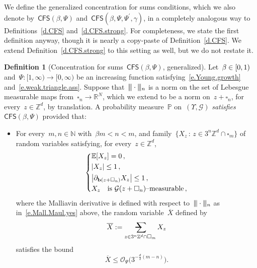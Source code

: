 \documentclass[11pt,twoside]{article} %
\makeatletter
\let\oldsquare\square %
\renewcommand{\square}{\oldsquare}
\numberwithin{equation}{section}
\theoremstyle{definition}
\newtheorem{definition}[theorem]{Definition}
\let\originalleft\left
\let\originalright\right
\renewcommand{\left}{\mathopen{}\mathclose\bgroup\originalleft}
\renewcommand{\right}{\aftergroup\egroup\originalright}
\newcommand{\vertiii}{\vert\kern-0.3ex\vert\kern-0.25ex\vert}
\newcommand*{\N}{\ensuremath{\mathbb{N}}}
\newcommand*{\R}{\ensuremath{\mathbb{R}}}
\newcommand*{\Zd}{\ensuremath{\mathbb{Z}^d}}
\renewcommand{\b}{\ensuremath{\mathbf{b}}}
\newcommand{\cu}{\square}
\renewcommand{\P}{\mathbb{P}}
\newcommand{\E}{\mathbb{E}}
\renewcommand{\O}{\mathcal{O}}
\newcommand{\avsum}{\mathop{\mathpalette\avsuminner\relax}\displaylimits}
\newcommand\avsuminner[2]{%
  {\sbox0{$\m@th#1\sum$}%
   \vphantom{\usebox0}%
   \ooalign{%
     \hidewidth
     \smash{\,\rule[.23em]{8.8pt}{1.1pt} \relax}%
     \hidewidth\cr
   ~$\m@th#1\sum$\cr
   }%
  }%
}
\newcommand{\CFS}{\mathsf{CFS}}
\makeatother
\begin{document}
We define the generalized concentration for sums conditions, which we also denote by~$\CFS(\beta,\Psi)$ and~$\CFS(\beta,\Psi,\Psi^\prime,\gamma)$, in a completely analogous way to Definitions~\ref{d.CFS} and~\ref{d.CFS.strong}. 
For completeness, we state the first definition anyway, though it is nearly a copy-paste of Definition~\ref{d.CFS}. We extend Definition~\ref{d.CFS.strong} to this setting as well, but we do not restate it. 

\begin{definition}[Concentration for sums~$\CFS(\beta,\Psi)$, generalized]
\label{d.CFS.general}
Let~$\beta \in \left[0,1\right)$ and~$\Psi:[1,\infty) \to [0,\infty)$ be an increasing function satisfying~\eqref{e.Young.growth} and~\eqref{e.weak.triangle.ass}. Suppose that~$\vertiii\cdot \vertiii_n$ is a norm on the set of Lebesgue measurable maps from~$\cu_n \to \R^N$, which we extend to be a norm on~$z+\cu_n$, for every~$z\in\Zd$, by translation. 
A probability measure~$\P$ on~$(\Upsilon,\mathcal{G})$ \emph{satisfies~$\CFS(\beta,\Psi)$} provided that: 
\begin{itemize}
\item
For every~$m,n\in\N$ with~$\beta m < n<m$, and  family~$\{ X_z \,:\, z\in 3^n\Zd\cap \cu_m\}$ of random variables satisfying, for every~$z\in\Zd$,
\begin{equation} 
\label{e.CFS.ass.gen}
\left\{
\begin{aligned}
& \E\left[ X_z \right]=0 \,, 
\\ & 
\left| X_z \right| \leq 1\,,
\\ &   
\left| \partial_{\b(z+\cu_n)} X_z\right| \leq 1 \,,
\\
& X_z \quad \mbox{is~$\mathcal{G}(z+\cu_n)$--measurable} \,, \\
\end{aligned}
\right.
\end{equation}
where the Malliavin derivative is defined with respect to~$\vertiii \cdot \vertiii_{n}$ as in~\eqref{e.Mall.Maul.yes} above,
the random variable~$\overline{X}$ defined by
\begin{equation} 
\label{e.Z.norm.gen}
\overline{X}  :=  \avsum_{z\in 3^n\Zd\cap \cu_m}  X_z
\end{equation}
satisfies the bound
\begin{equation}
\label{e.CFS.gen}
\overline{X}
\leq
\O_{\Psi}
\bigl( 3^{-\frac d2(m-n)} \bigr).
\end{equation}
\end{itemize}
\end{definition}
\end{document}
